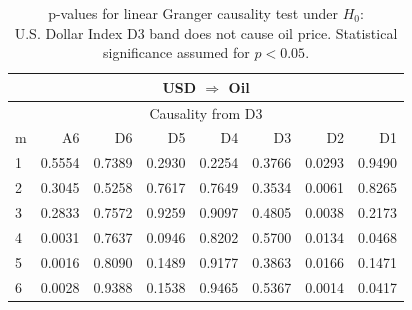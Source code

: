 %
%
\begin{table}[H]
\begin{center}
\begin{tabular}{l|r r r r r r r}
\hline\hline
\multicolumn{8}{c}{USD $\Rightarrow$ Oil}\\
\hline
\multicolumn{8}{c}{Causality from D3}\\
\hline\hline
m & A6 & D6 & D5 & D4 & D3 & D2 & D1 \\
\hline
1 & 0.5554 & 0.7389 & 0.2930 & 0.2254 & 0.3766 & \cellcolor{mygreen}0.0293 & 0.9490 \\
2 & 0.3045 & 0.5258 & 0.7617 & 0.7649 & 0.3534 & \cellcolor{mygreen}0.0061 & 0.8265 \\
3 & 0.2833 & 0.7572 & 0.9259 & 0.9097 & 0.4805 & \cellcolor{mygreen}0.0038 & 0.2173 \\
4 & \cellcolor{mygreen}0.0031 & 0.7637 & 0.0946 & 0.8202 & 0.5700 & \cellcolor{mygreen}0.0134 & \cellcolor{mygreen}0.0468 \\
5 & \cellcolor{mygreen}0.0016 & 0.8090 & 0.1489 & 0.9177 & 0.3863 & \cellcolor{mygreen}0.0166 & 0.1471 \\
6 & \cellcolor{mygreen}0.0028 & 0.9388 & 0.1538 & 0.9465 & 0.5367 & \cellcolor{mygreen}0.0014 & \cellcolor{mygreen}0.0417 \\
\hline\hline
\end{tabular}
\caption{p-values for linear Granger causality test under $H_0$:\\
U.S. Dollar Index D3 band does not cause oil price. Statistical significance assumed for $p<0.05$.}
\end{center}
\end{table}

